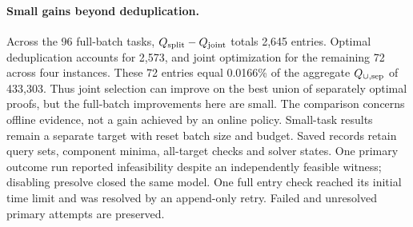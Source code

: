 \paragraph{Small gains beyond deduplication.}
Across the 96 full-batch tasks, $Q_{\rm split}-Q_{\rm joint}$ totals 2,645 entries. Optimal deduplication accounts for 2,573, and joint optimization for the remaining 72 across four instances. These 72 entries equal 0.0166\% of the aggregate $Q_{\cup,\rm sep}$ of 433,303. Thus joint selection can improve on the best union of separately optimal proofs, but the full-batch improvements here are small. The comparison concerns offline evidence, not a gain achieved by an online policy. Small-task results remain a separate target with reset batch size and budget. Saved records retain query sets, component minima, all-target checks and solver states. One primary outcome run reported infeasibility despite an independently feasible witness; disabling presolve closed the same model. One full entry check reached its initial time limit and was resolved by an append-only retry. Failed and unresolved primary attempts are preserved.


